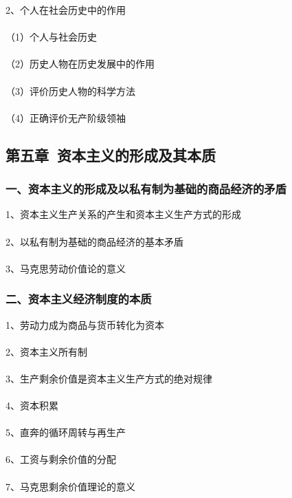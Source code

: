 \documentclass{ctexart}
\begin{document}
2、个人在社会历史中的作用
\\\\
（1）个人与社会历史
\\\\
（2）历史人物在历史发展中的作用
\\\\
（3）评价历史人物的科学方法
\\\\
（4）正确评价无产阶级领袖

\subsection{第五章\ 资本主义的形成及其本质}
\subsubsection{一、资本主义的形成及以私有制为基础的商品经济的矛盾}
1、资本主义生产关系的产生和资本主义生产方式的形成
\\\\

2、以私有制为基础的商品经济的基本矛盾
\\\\

3、马克思劳动价值论的意义

\subsubsection{二、资本主义经济制度的本质}
1、劳动力成为商品与货币转化为资本
\\\\

2、资本主义所有制
\\\\

3、生产剩余价值是资本主义生产方式的绝对规律
\\\\

4、资本积累
\\\\

5、直奔的循环周转与再生产
\\\\

6、工资与剩余价值的分配
\\\\

7、马克思剩余价值理论的意义
\\\\
\end{document}
